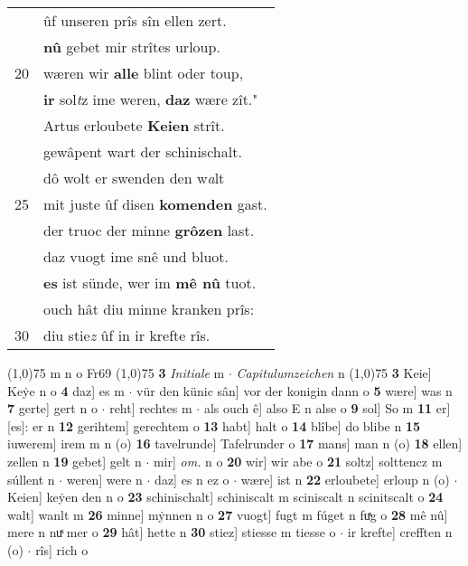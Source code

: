 \documentclass[8pt,a4paper,notitlepage]{article}
\begin{document}
\begin{table}[ht]
\begin{minipage}[t]{0.5\linewidth}
\begin{tabular}{rl}
 & ûf unseren prîs sîn ellen zert.\\ 
 & \textbf{nû} gebet mir strîtes urloup.\\ 
20 & wæren wir \textbf{alle} blint oder toup,\\ 
 & \textbf{ir} sol\textit{t}z ime weren, \textbf{daz} wære zît."\\ 
 & Artus erloubete \textbf{Keien} strît.\\ 
 & gewâpent wart der schinischalt.\\ 
 & dô wolt er swenden den w\textit{a}lt\\ 
25 & mit juste ûf disen \textbf{komenden} gast.\\ 
 & der truoc der minne \textbf{grôzen} last.\\ 
 & daz vuogt ime snê und bluot.\\ 
 & \textbf{es} ist sünde, wer im \textbf{mê nû} tuot.\\ 
 & ouch hât diu minne kranken prîs:\\ 
30 & diu stie\textit{z} ûf in ir krefte rîs.\\ 
\end{tabular}
\scriptsize
\line(1,0){75} \newline
m n o Fr69 \newline
\line(1,0){75} \newline
\textbf{3} \textit{Initiale} m   $\cdot$ \textit{Capitulumzeichen} n  \newline
\line(1,0){75} \newline
\textbf{3} Keie] Keẏe n o \textbf{4} daz] es m  $\cdot$ vür den künic sân] vor der konigin dann o \textbf{5} wære] was n \textbf{7} gerte] gert n o  $\cdot$ reht] rechtes m  $\cdot$ als ouch ê] also E n alse o \textbf{9} sol] So m \textbf{11} er] [es]: er n \textbf{12} gerihtem] gerechtem o \textbf{13} habt] halt o \textbf{14} blîbe] do blibe n \textbf{15} iuwerem] irem m n (o) \textbf{16} tavelrunde] Tafelrunder o \textbf{17} mans] man n (o) \textbf{18} ellen] zellen n \textbf{19} gebet] gelt n  $\cdot$ mir] \textit{om.} n o \textbf{20} wir] wir abe o \textbf{21} soltz] solttencz m súllent n  $\cdot$ weren] were n  $\cdot$ daz] es n ez o  $\cdot$ wære] ist n \textbf{22} erloubete] erloup n (o)  $\cdot$ Keien] keẏen den n o \textbf{23} schinischalt] schiniscalt m sciniscalt n scinitscalt o \textbf{24} walt] wanlt m \textbf{26} minne] mẏnnen n o \textbf{27} vuogt] fugt m fúget n fuͯg o \textbf{28} mê nû] mere n nuͯ mer o \textbf{29} hât] hette n \textbf{30} stiez] stiesse m tiesse o  $\cdot$ ir krefte] crefften n (o)  $\cdot$ rîs] rich o \newline
\end{minipage}
\end{table}
\end{document}
